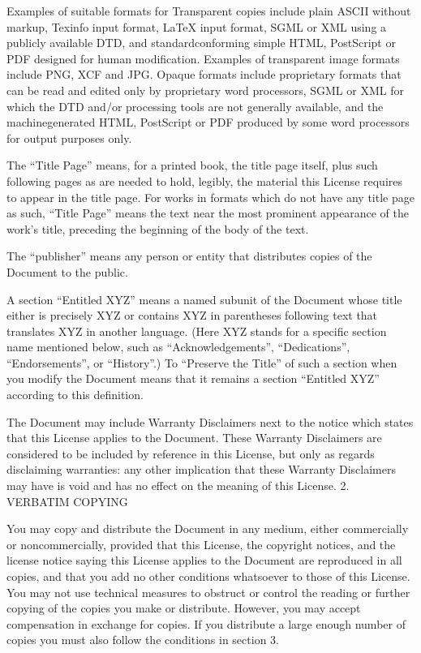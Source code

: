 \documentclass[letterpaper,10pt,english]{sphinxmanual}
\begin{document}
\sphinxAtStartPar
Examples of suitable formats for Transparent copies include plain ASCII without markup, Texinfo input format, LaTeX input format, SGML or XML using a publicly available DTD, and standard\sphinxhyphen{}conforming simple HTML, PostScript or PDF designed for human modification. Examples of transparent image formats include PNG, XCF and JPG. Opaque formats include proprietary formats that can be read and edited only by proprietary word processors, SGML or XML for which the DTD and/or processing tools are not generally available, and the machine\sphinxhyphen{}generated HTML, PostScript or PDF produced by some word processors for output purposes only.

\sphinxAtStartPar
The “Title Page” means, for a printed book, the title page itself, plus such following pages as are needed to hold, legibly, the material this License requires to appear in the title page. For works in formats which do not have any title page as such, “Title Page” means the text near the most prominent appearance of the work’s title, preceding the beginning of the body of the text.

\sphinxAtStartPar
The “publisher” means any person or entity that distributes copies of the Document to the public.

\sphinxAtStartPar
A section “Entitled XYZ” means a named subunit of the Document whose title either is precisely XYZ or contains XYZ in parentheses following text that translates XYZ in another language. (Here XYZ stands for a specific section name mentioned below, such as “Acknowledgements”, “Dedications”, “Endorsements”, or “History”.) To “Preserve the Title” of such a section when you modify the Document means that it remains a section “Entitled XYZ” according to this definition.

\sphinxAtStartPar
The Document may include Warranty Disclaimers next to the notice which states that this License applies to the Document. These Warranty Disclaimers are considered to be included by reference in this License, but only as regards disclaiming warranties: any other implication that these Warranty Disclaimers may have is void and has no effect on the meaning of this License.
2. VERBATIM COPYING

\sphinxAtStartPar
You may copy and distribute the Document in any medium, either commercially or noncommercially, provided that this License, the copyright notices, and the license notice saying this License applies to the Document are reproduced in all copies, and that you add no other conditions whatsoever to those of this License. You may not use technical measures to obstruct or control the reading or further copying of the copies you make or distribute. However, you may accept compensation in exchange for copies. If you distribute a large enough number of copies you must also follow the conditions in section 3.
\end{document}
